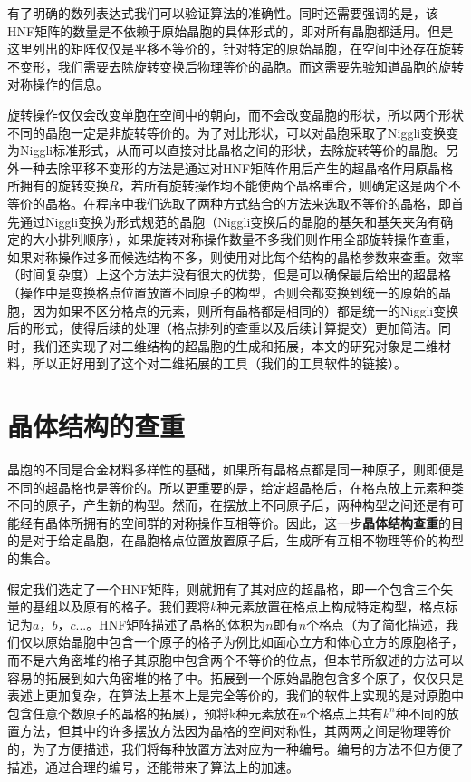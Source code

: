 有了明确的数列表达式我们可以验证算法的准确性。同时还需要强调的是，该HNF矩阵的数量是不依赖于原始晶胞的具体形式的，即对所有晶胞都适用。但是这里列出的矩阵仅仅是平移不等价的，针对特定的原始晶胞，在空间中还存在旋转不变形，我们需要去除旋转变换后物理等价的晶胞。而这需要先验知道晶胞的旋转对称操作的信息。

旋转操作仅仅会改变单胞在空间中的朝向，而不会改变晶胞的形状，所以两个形状不同的晶胞一定是非旋转等价的。为了对比形状，可以对晶胞采取了Niggli变换\cite{kvrivy1976unified,grosse2004numerically}变为Niggli标准形式，从而可以直接对比晶格之间的形状，去除旋转等价的晶胞。另外一种去除平移不变形的方法\cite{hart2008algorithm}是通过对HNF矩阵作用后产生的超晶格作用原晶格所拥有的旋转变换$R$，若所有旋转操作均不能使两个晶格重合，则确定这是两个不等价的晶格。在程序中我们选取了两种方式结合的方法来选取不等价的晶格，即首先通过Niggli变换为形式规范的晶胞（Niggli变换后的晶胞的基矢和基矢夹角有确定的大小排列顺序），如果旋转对称操作数量不多我们则作用全部旋转操作查重，如果对称操作过多而候选结构不多，则使用对比每个结构的晶格参数来查重。效率（时间复杂度）上这个方法并没有很大的优势，但是可以确保最后给出的超晶格（操作中是变换格点位置放置不同原子的构型，否则会都变换到统一的原始的晶胞，因为如果不区分格点的元素，则所有晶格都是相同的）都是统一的Niggli变换后的形式，使得后续的处理（格点排列的查重以及后续计算提交）更加简洁。同时，我们还实现了对二维结构的超晶胞的生成和拓展，本文的研究对象是二维材料，所以正好用到了这个对二维拓展的工具（我们的工具软件的链接\cite{pniggli}）。

\section{晶体结构的查重}
晶胞的不同是合金材料多样性的基础，如果所有晶格点都是同一种原子，则即便是不同的超晶格也是等价的。所以更重要的是，给定超晶格后，在格点放上元素种类不同的原子，产生新的构型。然而，在摆放上不同原子后，两种构型之间还是有可能经有晶体所拥有的空间群的对称操作互相等价。因此，这一步{\textbf{晶体结构查重}}的目的是对于给定晶胞，在晶胞格点位置放置原子后，生成所有互相不物理等价的构型的集合。

假定我们选定了一个HNF矩阵，则就拥有了其对应的超晶格，即一个包含三个矢量的基组以及原有的格子。我们要将$k$种元素放置在格点上构成特定构型，格点标记为$a$，$b$，$c$...。HNF矩阵描述了晶格的体积为$n$即有$n$个格点（为了简化描述，我们仅以原始晶胞中包含一个原子的格子为例比如面心立方和体心立方的原胞格子，而不是六角密堆的格子其原胞中包含两个不等价的位点，但本节所叙述的方法可以容易的拓展到如六角密堆的格子中\cite{hart2009generating}。拓展到一个原始晶胞包含多个原子，仅仅只是表述上更加复杂，在算法上基本上是完全等价的，我们的软件上实现的是对原胞中包含任意个数原子的晶格的拓展），预将k种元素放在$n$个格点上共有$k^n$种不同的放置方法，但其中的许多摆放方法因为晶格的空间对称性，其两两之间是物理等价的，为了方便描述，我们将每种放置方法对应为一种编号。编号的方法不但方便了描述，通过合理的编号，还能带来了算法上的加速。

